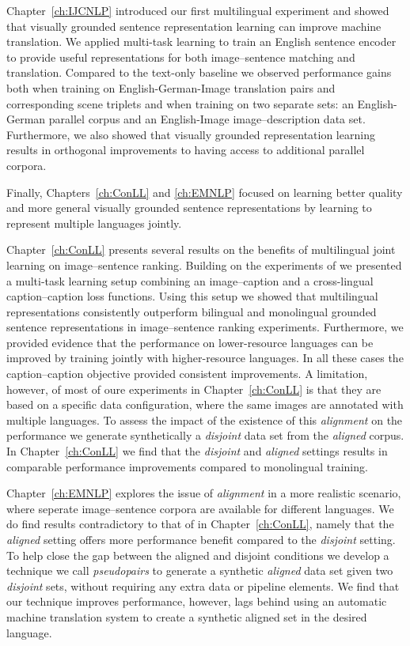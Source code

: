 Chapter~\ref{ch:IJCNLP} introduced our first multilingual experiment and showed that visually grounded sentence
representation learning can improve machine translation. 
We applied multi-task learning to train an English sentence encoder to provide useful representations for both
image--sentence matching and translation. Compared to the text-only baseline 
we observed performance gains both when 
training on English-German-Image translation pairs and corresponding scene triplets and when training on two separate
sets: an English-German parallel corpus and an English-Image image--description data set. 
Furthermore, we also showed that visually grounded representation learning results in orthogonal 
improvements to having access to additional parallel corpora.

Finally,  Chapters~\ref{ch:ConLL} and \ref{ch:EMNLP} focused on learning better quality and more general 
visually grounded sentence representations by learning to represent multiple languages jointly. 

Chapter~\ref{ch:ConLL} presents several results on the benefits of multilingual joint learning on image--sentence
ranking. Building on the experiments of \cite{gella2017image} we presented a multi-task learning setup
combining an image--caption and a cross-lingual caption--caption  loss functions. Using this setup we showed that
multilingual representations consistently outperform bilingual and monolingual grounded sentence representations
in image--sentence ranking experiments. Furthermore, we provided evidence that the performance on lower-resource 
languages can be improved by training jointly with higher-resource languages. In all these cases the caption--caption
objective provided consistent improvements.												
A limitation, however, of most of oure experiments in Chapter~\ref{ch:ConLL} is that they are based on a 
specific data configuration, where the same images are annotated with multiple languages. To assess
the impact of the existence of  this \emph{alignment} on the performance we generate synthetically a \emph{disjoint}
data set from the \emph{aligned} corpus. In Chapter~\ref{ch:ConLL} we find that the \emph{disjoint} and \emph{aligned}
settings results in comparable performance improvements compared to monolingual training.

Chapter~\ref{ch:EMNLP} explores the issue of \emph{alignment} in a more realistic scenario, where
seperate image--sentence corpora are available for different languages. 
We do find results contradictory to that of in Chapter~\ref{ch:ConLL}, namely that the \emph{aligned}
setting offers more performance benefit compared to the \emph{disjoint} setting. 
To help close the gap between the aligned and disjoint conditions we develop a technique we call \emph{pseudopairs} 
to generate a synthetic \emph{aligned} data set given two \emph{disjoint} sets, without requiring any extra
data or pipeline elements. We find that our technique improves performance, however, lags behind using
an automatic machine translation system to create a synthetic aligned set in the desired language.

